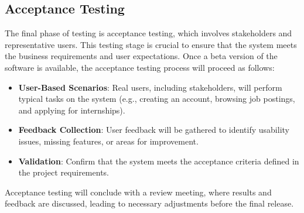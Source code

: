 \subsection{Acceptance Testing}

The final phase of testing is acceptance testing, which involves stakeholders and representative users. This testing stage is crucial to ensure that the system meets the business requirements and user expectations. Once a beta version of the software is available, the acceptance testing process will proceed as follows:

\begin{itemize}
    \item \textbf{User-Based Scenarios}: Real users, including stakeholders, will perform typical tasks on the system (e.g., creating an account, browsing job postings, and applying for internships).
    \item \textbf{Feedback Collection}: User feedback will be gathered to identify usability issues, missing features, or areas for improvement.
    \item \textbf{Validation}: Confirm that the system meets the acceptance criteria defined in the project requirements.
\end{itemize}

Acceptance testing will conclude with a review meeting, where results and feedback are discussed, leading to necessary adjustments before the final release.
